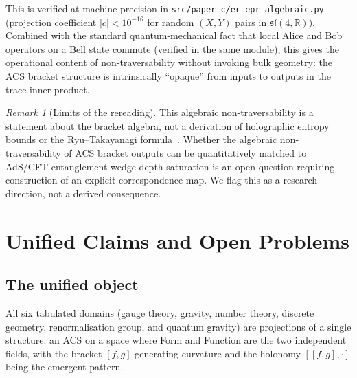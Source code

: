 \documentclass[11pt,a4paper]{article}
\theoremstyle{plain}
\theoremstyle{definition}
\theoremstyle{remark}
\newtheorem{remark}[theorem]{Remark}
\begin{document}
\noindent
This is verified at machine precision in
\nolinkurl{src/paper_c/er_epr_algebraic.py} (projection coefficient
$|c| < 10^{-16}$ for random $(X, Y)$ pairs in $\mathfrak{sl}(4,\mathbb{R})$).
Combined with the standard quantum-mechanical fact that local Alice
and Bob operators on a Bell state commute (verified in the same module),
this gives the operational content of non-traversability without
invoking bulk geometry: the ACS bracket structure is intrinsically
``opaque'' from inputs to outputs in the trace inner product.

\begin{remark}[Limits of the rereading]
This algebraic non-traversability is a statement about the bracket
algebra, not a derivation of holographic entropy bounds or the
Ryu--Takayanagi formula~\cite{RyuTakayanagi2006}.  Whether the algebraic
non-traversability of ACS bracket outputs can be quantitatively
matched to AdS/CFT entanglement-wedge depth saturation is an
open question requiring construction of an explicit correspondence
map.  We flag this as a research direction, not a derived consequence.
\end{remark}

\section{Unified Claims and Open Problems}
\label{sec:unified}

\subsection{The unified object}

All six tabulated domains (gauge theory, gravity, number theory, discrete
geometry, renormalisation group, and quantum gravity) are projections of a single structure: an ACS on a space where 
Form and Function are the two independent fields, with the bracket 
$[f, g]$ generating curvature and the holonomy $[[f,g],\cdot]$ 
being the emergent pattern.
\end{document}
